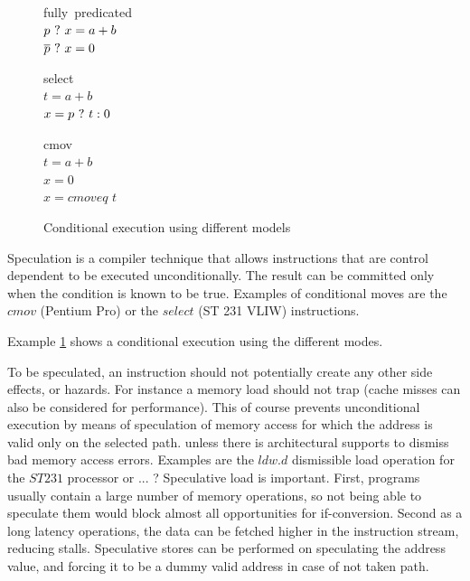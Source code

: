 \begin{figure}
\begin{minipage}[t]{3cm}
\mbox{fully predicated} \\
$p ~?~ x = a + b $ \\
$\overline{p} ~?~ x = 0 $ \\
\end{minipage} 
\begin{minipage}[t]{3cm}
\mbox{select} \\
$t = a + b $ \\
$x= p ~?~ t : 0 $ \\
\end{minipage}
\begin{minipage}[t]{3cm}
\mbox{cmov} \\
$t = a + b $ \\
$x = 0 $ \\
$x = cmoveq$ $t$ \\
\end{minipage}
\caption{Conditional execution using different models}
\label{fig:pred}
\end{figure}

Speculation is a compiler technique that allows instructions that are control dependent to be executed unconditionally. The result can be committed only when the condition is known to be true. Examples of conditional moves are the $cmov$ (Pentium Pro) or the $select$ (ST 231 VLIW) instructions.

Example \ref{fig:pred} shows a conditional execution using the different modes.

To be speculated, an instruction should not potentially create any other side effects, or hazards. For instance a memory load should not trap (cache misses can also be considered for performance). This of course prevents unconditional execution by means of speculation of memory access for which the address is valid only on the selected path. unless there is architectural supports to dismiss bad memory access errors. Examples are the $ldw.d$ dismissible load operation for the $ST231$ processor or ... ? 
Speculative load is important. First, programs usually contain a large number of memory operations, so not being able to speculate them would block almost all opportunities for if-conversion. Second as a long latency operations, the data can be fetched higher in the instruction stream, reducing stalls.
Speculative stores can be performed on speculating the address value, and forcing it to be a dummy valid address in case of not taken path.

